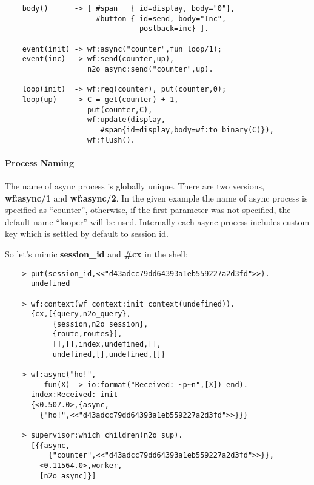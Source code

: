 \vspace{1\baselineskip}
\begin{lstlisting}
    body()      -> [ #span   { id=display, body="0"},
                     #button { id=send, body="Inc",
                               postback=inc} ].

    event(init) -> wf:async("counter",fun loop/1);
    event(inc)  -> wf:send(counter,up),
                   n2o_async:send("counter",up).

    loop(init)  -> wf:reg(counter), put(counter,0);
    loop(up)    -> C = get(counter) + 1,
                   put(counter,C),
                   wf:update(display,
                      #span{id=display,body=wf:to_binary(C)}),
                   wf:flush().
\end{lstlisting}
\vspace{1\baselineskip}

\paragraph{\bf Process Naming}
The name of async process is globally unique. There are two
versions, {\bf wf:async/1} and {\bf wf:async/2}. In the given example
the name of async process is specified as ``counter'', otherwise,
if the first parameter was not specified, the default name ``looper''
will be used. Internally each async process includes custom key which
is settled by default to session id.

\newpage
So let's mimic {\bf session\_id} and {\bf \#cx} in the shell:

\vspace{1\baselineskip}
\begin{lstlisting}
    > put(session_id,<<"d43adcc79dd64393a1eb559227a2d3fd">>).
      undefined

    > wf:context(wf_context:init_context(undefined)).
      {cx,[{query,n2o_query},
           {session,n2o_session},
           {route,routes}],
           [],[],index,undefined,[],
           undefined,[],undefined,[]}

    > wf:async("ho!",
         fun(X) -> io:format("Received: ~p~n",[X]) end).
      index:Received: init
      {<0.507.0>,{async,
        {"ho!",<<"d43adcc79dd64393a1eb559227a2d3fd">>}}}

    > supervisor:which_children(n2o_sup).
      [{{async,
          {"counter",<<"d43adcc79dd64393a1eb559227a2d3fd">>}},
        <0.11564.0>,worker,
        [n2o_async]}]
\end{lstlisting}
\vspace{1\baselineskip}

